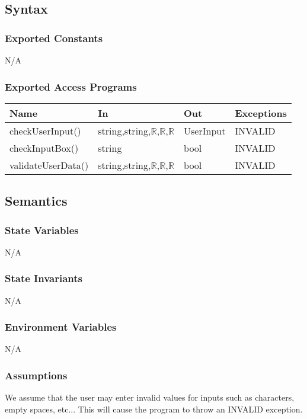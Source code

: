 \documentclass[12pt, titlepage]{article}
\begin{document}
\subsection{Syntax}

\subsubsection{Exported Constants}
N/A

\subsubsection{Exported Access Programs}

\begin{center}
\begin{tabular}{p{4cm} p{6cm} p{3cm} p{2cm}}
\hline
\textbf{Name} & \textbf{In} & \textbf{Out} & \textbf{Exceptions} \\
\hline
checkUserInput() & string,string,$\mathbb{R}$,$\mathbb{R}$,$\mathbb{R}$ & UserInput & INVALID \\
checkInputBox() & string & bool & INVALID \\
validateUserData() & string,string,$\mathbb{R}$,$\mathbb{R}$,$\mathbb{R}$ & bool & INVALID \\
\hline
\end{tabular}
\end{center}

\subsection{Semantics}

\subsubsection{State Variables}
N/A

\subsubsection{State Invariants}
N/A

\subsubsection{Environment Variables}

N/A

\subsubsection{Assumptions}
We assume that the user may enter invalid values for inputs such as characters, empty spaces, etc...
This will cause the program to throw an INVALID exception.
\end{document}
